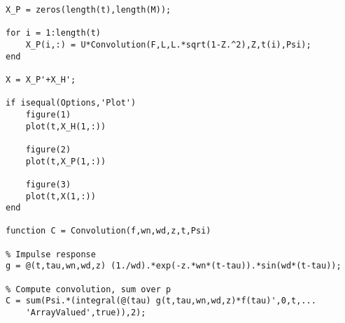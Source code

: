 \documentclass{article}
\begin{document}
\begin{lstlisting}[style=Matlab-editor]
X_P = zeros(length(t),length(M));

for i = 1:length(t)
    X_P(i,:) = U*Convolution(F,L,L.*sqrt(1-Z.^2),Z,t(i),Psi);
end

X = X_P'+X_H';

if isequal(Options,'Plot')
    figure(1)
    plot(t,X_H(1,:))
    
    figure(2)
    plot(t,X_P(1,:))
    
    figure(3)
    plot(t,X(1,:))
end

function C = Convolution(f,wn,wd,z,t,Psi)

% Impulse response
g = @(t,tau,wn,wd,z) (1./wd).*exp(-z.*wn*(t-tau)).*sin(wd*(t-tau));

% Compute convolution, sum over p
C = sum(Psi.*(integral(@(tau) g(t,tau,wn,wd,z)*f(tau)',0,t,...
    'ArrayValued',true)),2);
\end{lstlisting}
\newpage
\end{document}
